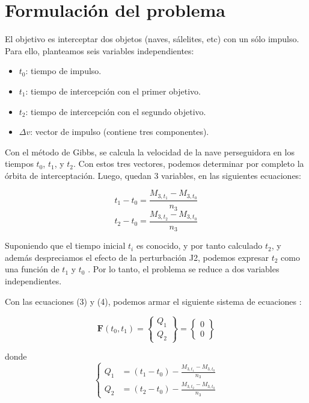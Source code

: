 \section{Formulación del problema}
El objetivo es interceptar dos objetos (naves, sálelites, etc) con un sólo impulso.
Para ello, planteamos seis variables independientes:

\begin{itemize}
    \item $t_0$: tiempo de impulso.
    \item $t_1$: tiempo de intercepción con el primer objetivo.
    \item $t_2$: tiempo de intercepción con el segundo objetivo.
    \item $\Delta{v}$: vector de impulso (contiene tres componentes).
\end{itemize}

Con el método de Gibbs, se calcula la velocidad de la nave perseguidora en los tiempos
$t_0$, $t_1$, y $t_2$. Con estos tres vectores, podemos determinar por completo la órbita
de interceptación. Luego, quedan 3 variables, en las siguientes ecuaciones:

\begin{equation}
    t_1 - t_0 = \frac{M_{3, t_1} - M_{3, t_0}}{n_3}
\end{equation}
\begin{equation}
    t_2 - t_0 = \frac{M_{3, t_2} - M_{3, t_0}}{n_3}
\end{equation}

Suponiendo que el tiempo inicial $t_i$ es conocido, y por tanto calculado $t_2$, y además despreciamos
el efecto de la perturbación J2, podemos expresar $t_2$ como una función de $t_1$ y $t_0$ \parencite{xia2021}.
Por lo tanto, el problema se reduce a dos variables independientes.

Con las ecuaciones (3) y (4), podemos armar el siguiente sistema de ecuaciones \parencite{xia2021}:

\begin{equation}
    \mathbf{F}(t_0, t_1) =
    \begin{Bmatrix}
        Q_1 \\ Q_2
    \end{Bmatrix}
    =
    \begin{Bmatrix}
        0 \\ 0
    \end{Bmatrix}
\end{equation}

donde
\begin{equation}
    \left\{
    \begin{aligned}
        Q_1 & = (t_1 - t_0) - \frac{M_{3, t_1} - M_{3, t_0}}{n_3} \\
        Q_2 & = (t_2 - t_0) - \frac{M_{3, t_2} - M_{3, t_0}}{n_3}
    \end{aligned}
    \right.
\end{equation}

